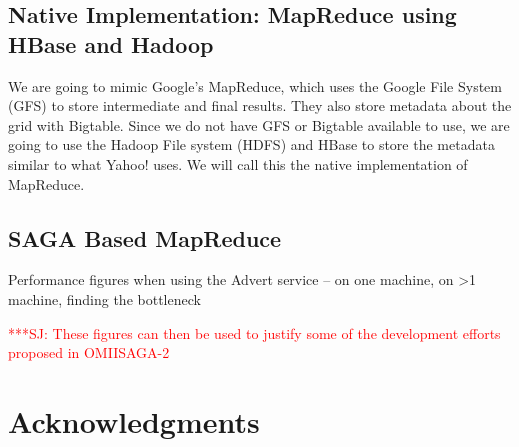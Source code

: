 \documentclass[conference,final]{IEEEtran}
\newcommand{\jhanote}[1]{ {\textcolor{red} { ***SJ: #1 }}}
\newcommand{\jhanote}[1]{}
\begin{document}
\subsection*{Native Implementation: MapReduce using HBase and Hadoop}
We are going to mimic Google's MapReduce, which uses the Google File
System (GFS) to store intermediate and final results.  They also store
metadata about the grid with Bigtable.  Since we do not have GFS or
Bigtable available to use, we are going to use the Hadoop File system
(HDFS) and HBase to store the metadata similar to what Yahoo! uses.
We will call this the native implementation of MapReduce.

\subsection*{SAGA Based MapReduce}

Performance figures when using the Advert service -- on one machine,
on >1 machine, finding the bottleneck

\jhanote{These figures can then be used to justify some of the 
  development efforts proposed in OMIISAGA-2}

\section{Acknowledgments}



\end{document}
